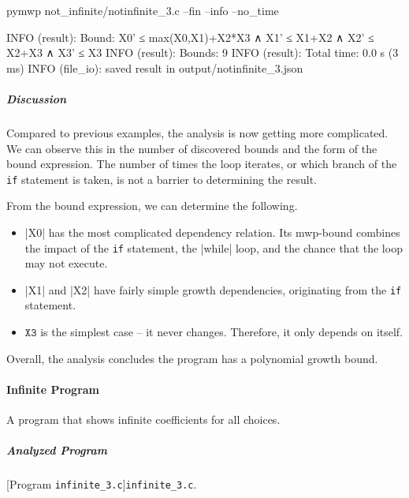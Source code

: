 \begin{cmdlisting}[label={lst:ex3-run-cmd}]
pymwp not_infinite/notinfinite_3.c --fin --info --no_time
\end{cmdlisting}

\begin{outlisting}[label={lst:ex3-output}]
INFO (result): Bound: X0' ≤ max(X0,X1)+X2*X3 ∧ X1' ≤ X1+X2 ∧ X2' ≤ X2+X3 ∧ X3' ≤ X3
INFO (result): Bounds: 9
INFO (result): Total time: 0.0 s (3 ms)
INFO (file_io): saved result in output/notinfinite_3.json
\end{outlisting}

\subparagraph*{Discussion}\label{discussion}

Compared to previous examples, the analysis is now getting more complicated.
We can observe this in the number of discovered bounds and the form of the bound expression.
The number of times the loop iterates, or which branch of the \texttt{if} statement is taken, is not a barrier to determining the result.

From the bound expression, we can determine the following.

\begin{itemize}
\item \pr|X0| has the most complicated dependency relation.
Its mwp-bound combines the impact of the \texttt{if} statement, the \pr|while| loop, and the chance that the loop may not execute.

\item \pr|X1| and \pr|X2| have fairly simple growth dependencies, originating from the \texttt{if} statement.

\item \(\texttt{X3}\) is the simplest case -- it never changes.
Therefore, it only depends on itself.
\end{itemize}

Overall, the analysis concludes the program has a polynomial growth bound.

\paragraph{Infinite Program}\label{inf-prog}
A program that shows infinite coefficients for all choices.

\subparagraph*{Analyzed Program}

\begin{center}
\begin{minipage}{\textwidth}
[Program \texttt{infinite\_3.c}]{\texttt{infinite\_3.c}.}
\label{lst:inifnite3}
\end{minipage}
\end{center}

